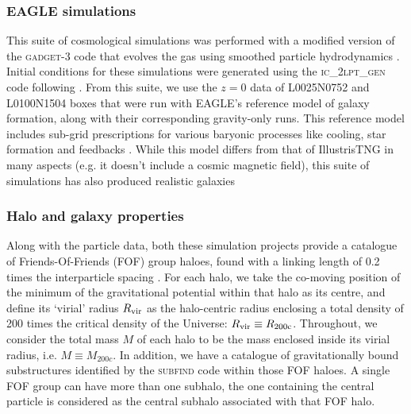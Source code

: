 \subsubsection{EAGLE simulations}
This suite of cosmological simulations was performed with a modified version of the \textsc{gadget-3} code that evolves the gas using smoothed particle hydrodynamics \citep[][]{2005MNRAS.364.1105S}. Initial conditions for these simulations were generated using the \textsc{ic\_2lpt\_gen} code following \cite{2010MNRAS.403.1859J}. 
From this suite, we use the $z=0$ data of L0025N0752 and L0100N1504 boxes that were run with EAGLE's reference model of galaxy formation, along with their corresponding gravity-only runs. This reference model includes sub-grid prescriptions for various baryonic processes like cooling, star formation and feedbacks  \citep[see][for more details]{2015MNRAS.446..521S,2015MNRAS.450.1937C}. While this model differs from that of IllustrisTNG in many aspects (e.g. it doesn't include a cosmic magnetic field), this suite of simulations has also produced realistic galaxies \citep[see e.g.][]{2015MNRAS.448.2941S,2015MNRAS.450.4486F,2015MNRAS.452.2879T}






\subsubsection{Halo and galaxy properties}
\label{sec:halo-props-ch:simbase}
Along with the particle data, 
both these simulation projects provide a catalogue of Friends-Of-Friends (FOF) group haloes, found with a linking length of 0.2 times the interparticle spacing \citep[see][for specifics]{2016A&C....15...72M,2019ComAC...6....2N}.
For each halo, we take the co-moving position of the minimum of the gravitational potential within that halo as its centre, 
and define its `virial' radius $R_{\rm vir}$ as the halo-centric radius enclosing a total density of 200 times the critical density of the Universe:  $R_{\rm vir}\equiv R_{\rm 200c}$. Throughout, we consider the total mass $M$ of each halo to be the mass enclosed inside its virial radius, i.e. $M\equiv M_{200c}$. 
In addition, we have a catalogue of gravitationally bound substructures identified by the \textsc{subfind} code \citep{2001MNRAS.328..726S} within those FOF haloes. 
A single FOF group can have more than one subhalo, the one containing the central particle is considered as the central subhalo associated with that FOF halo.

